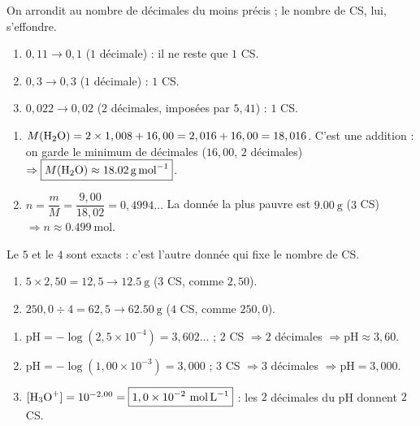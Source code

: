 \documentclass[11pt,a4paper]{article}
\begin{document}
\begin{corrige}
On arrondit au nombre de décimales du moins précis ; le nombre de CS, lui, s'effondre.
\begin{enumerate}[label=\alph*)]
  \item $0,11 \to \boxed{0,1}$ ($1$ décimale) : il ne reste que $1$ CS.
  \item $0,3 \to \boxed{0,3}$ ($1$ décimale) : $1$ CS.
  \item $0,022 \to \boxed{0,02}$ ($2$ décimales, imposées par $5,41$) : $1$ CS.
\end{enumerate}
\end{corrige}

\begin{corrige}
\begin{enumerate}[label=\alph*)]
  \item $M(\ce{H2O}) = 2\times1,008 + 16,00 = 2,016 + 16,00 = 18,016$. C'est une addition : on garde le
        minimum de décimales ($16,00$, $2$ décimales) $\Rightarrow \boxed{M(\ce{H2O})\approx\qty{18,02}{\gram\per\mole}}$.
  \item $n = \dfrac{m}{M} = \dfrac{9,00}{18,02} = 0,4994\ldots$ La donnée la plus pauvre est $\qty{9,00}{\gram}$
        ($3$ CS) $\Rightarrow \boxed{n\approx\qty{0,499}{\mole}}$.
\end{enumerate}
\end{corrige}

\begin{corrige}
Le $5$ et le $4$ sont exacts : c'est l'autre donnée qui fixe le nombre de CS.
\begin{enumerate}[label=\alph*)]
  \item $5\times2,50 = 12,5 \to \boxed{\qty{12,5}{\gram}}$ ($3$ CS, comme $2,50$).
  \item $250,0\div4 = 62,5 \to \boxed{\qty{62,50}{\gram}}$ ($4$ CS, comme $250,0$).
\end{enumerate}
\end{corrige}

\begin{corrige}
\begin{enumerate}[label=\alph*)]
  \item $\mathrm{pH}=-\log(2,5\times10^{-4})=3,602\ldots$ ; $2$ CS $\Rightarrow 2$ décimales $\Rightarrow
        \boxed{\mathrm{pH}\approx3,60}$.
  \item $\mathrm{pH}=-\log(1,00\times10^{-3})=3,000$ ; $3$ CS $\Rightarrow 3$ décimales $\Rightarrow
        \boxed{\mathrm{pH}=3,000}$.
  \item $[\ce{H3O+}]=10^{-2,00}=\boxed{1,0\times10^{-2}\ \si{\mol\per\litre}}$ : les $2$ décimales du pH
        donnent $2$ CS.
\end{enumerate}
\end{corrige}
\end{document}
